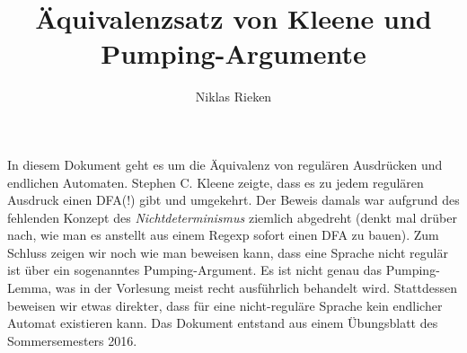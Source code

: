 \documentclass[11pt, a4paper]{article}
\author{Niklas Rieken}
\title{Äquivalenzsatz von Kleene und Pumping-Argumente}
\begin{document}
\maketitle

In diesem Dokument geht es um die Äquivalenz von regulären Ausdrücken und endlichen Automaten. Stephen C. Kleene zeigte, dass es zu jedem regulären Ausdruck einen DFA(!) gibt und umgekehrt. Der Beweis damals war aufgrund des fehlenden Konzept des \textit{Nichtdeterminismus} ziemlich abgedreht (denkt mal drüber nach, wie man es anstellt aus einem Regexp sofort einen DFA zu bauen). Zum Schluss zeigen wir noch wie man beweisen kann, dass eine Sprache nicht regulär ist über ein sogenanntes Pumping-Argument. Es ist nicht genau das Pumping-Lemma, was in der Vorlesung meist recht ausführlich behandelt wird. Stattdessen beweisen wir etwas direkter, dass für eine nicht-reguläre Sprache kein endlicher Automat existieren kann. Das Dokument entstand aus einem Übungsblatt des Sommersemesters 2016.
\end{document}
